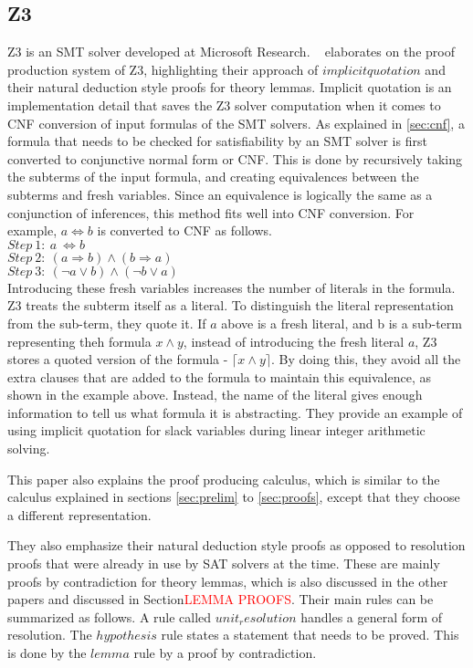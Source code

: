 \documentclass{article}
\begin{document}
\subsection{Z3}
\label{sec:z3}
Z3 is an SMT solver developed at Microsoft Research. 
~\cite{DBLP:conf/lpar/MouraB08} elaborates on the proof 
production system of Z3, highlighting their approach of 
$implicit quotation$ and their natural deduction style 
proofs for theory lemmas. Implicit quotation is an 
implementation detail that saves the Z3 solver 
computation when it comes to CNF conversion of input
formulas of the SMT solvers. As explained in 
\ref{sec:cnf}, a formula that needs to be checked 
for satisfiability by an SMT solver is first converted 
to conjunctive normal form or CNF. This is done by 
recursively taking the subterms of the input formula, 
and creating equivalences between the subterms and 
fresh variables. Since an equivalence is logically 
the same as a conjunction of inferences, this method 
fits well into CNF conversion. For example, 
$a \iff b$ is converted to CNF as follows. \\
$Step\ 1:\ a\ \iff b$ \\
$Step\ 2:\ (a \Rightarrow b) \land (b \Rightarrow a)$ \\
$Step\ 3:\ (\neg a \lor b) \land (\neg b \lor a)$ \\
Introducing these fresh variables increases the 
number of literals in the formula. Z3 treats the 
subterm itself as a literal. To distinguish the 
literal representation from the sub-term, they quote
it. If $a$ above is a fresh literal, and b is a 
sub-term representing theh formula $x \land y$,
instead of introducing the fresh literal $a$, 
Z3 stores a quoted version of the formula - 
$\lceil x \land y \rceil$. By doing this, they 
avoid all the extra clauses that are added to the 
formula to maintain this equivalence, as 
shown in the example above. Instead, the name of the 
literal gives enough information to tell us 
what formula it is abstracting. They provide an 
example of using implicit quotation for slack
variables during linear integer arithmetic solving.

This paper also explains the proof producing 
calculus, which is similar to the calculus explained in
sections \ref{sec:prelim} to \ref{sec:proofs}, 
except that they choose a different representation. 

They also emphasize their natural deduction style 
proofs as opposed to resolution proofs that were already
in use by SAT solvers at the time. These are mainly
proofs by contradiction for theory lemmas, which 
is also discussed in the other papers and discussed in 
Section\textcolor{red}{LEMMA PROOFS}. Their main rules
can be summarized as follows. A rule called 
$unit_resolution$ handles a general form of resolution.
The $hypothesis$ rule states a statement that needs to 
be proved. This is done by the $lemma$ rule by 
a proof by contradiction.
\end{document}
